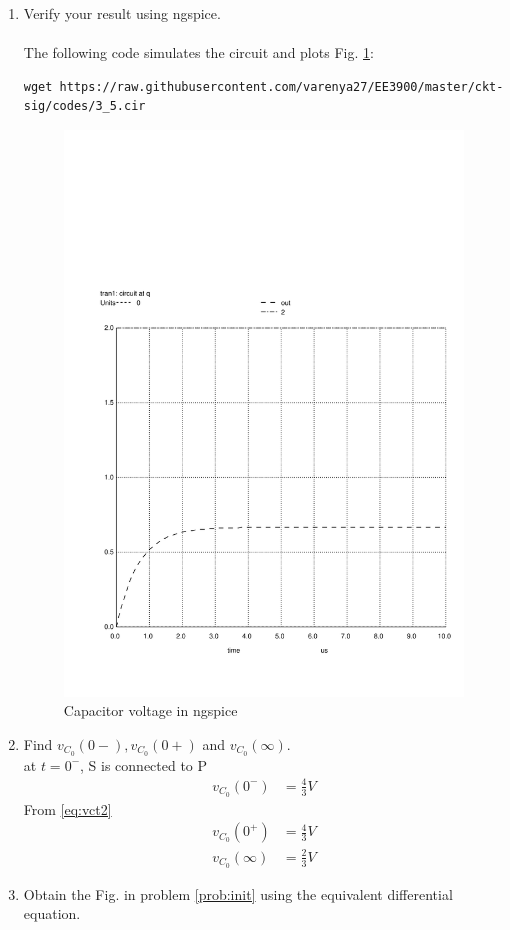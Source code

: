 \documentclass[journal,12pt,twocolumn]{IEEEtran}
\renewcommand\thesection{\arabic{section}}
\begin{document}
\begin{enumerate}[label=\arabic*.,ref=\thesection.\theenumi]
\item Verify your result using ngspice.
\\\\
	\solution The following code simulates the circuit and plots Fig. \ref{fig:circuit_q}:
\begin{lstlisting}
wget https://raw.githubusercontent.com/varenya27/EE3900/master/ckt-sig/codes/3_5.cir
\end{lstlisting}
	\begin{figure}[h!]
	    \centering
	    \includegraphics[width=\columnwidth]{figs/3_5.png}
	    \caption{Capacitor voltage in ngspice}
	    \label{fig:circuit_q}
	\end{figure}


\item Find $v_{C_0}(0-), v_{C_0}(0+)$ and  $v_{C_0}(\infty) $. \\
\solution at $t=0^-$, S is connected to P
\begin{align}
        v_{C_0}(0^-) &= \frac{4}{3}V
    \end{align}
    From \eqref{eq:vct2}
    \begin{align}
        v_{C_0}(0^+) &= \frac{4}{3}V\\
        v_{C_0}(\infty)&= \frac{2}{3}V
    \end{align}
\item Obtain the Fig.  in problem 
	\ref{prob:init}
		using the equivalent differential equation.


	\end{enumerate}
\end{document}
